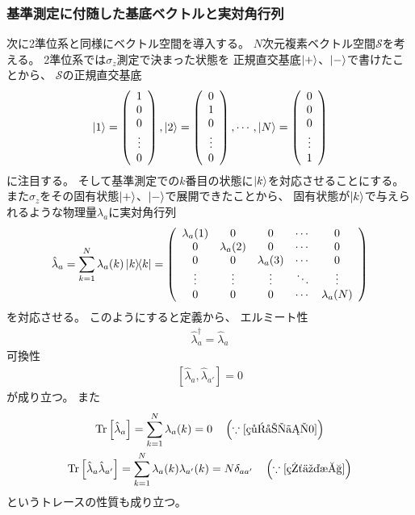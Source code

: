 \documentclass[a4paper, 10pt]{jsarticle}
\begin{document}
\subsubsection{基準測定に付随した基底ベクトルと実対角行列}
次に2準位系と同様にベクトル空間を導入する。
$N$次元複素ベクトル空間$\mathcal{S}$を考える。
2準位系では$\sigma_z$測定で決まった状態を
正規直交基底$\Ket{+}$、$\Ket{-}$で書けたことから、
$\mathcal{S}$の正規直交基底
\begin{align}
	\Ket{1} = \left( \begin{array}{c}
		1 \\ 0 \\ 0 \\ \vdots \\ 0
	\end{array} \right),
	\Ket{2} = \left( \begin{array}{c}
		0 \\ 1 \\ 0 \\ \vdots \\ 0
	\end{array} \right),
	\cdots,
	\Ket{N} = \left( \begin{array}{c}
		0 \\ 0 \\ 0 \\ \vdots \\ 1
	\end{array} \right)
	\label{ket{k}}
\end{align}
に注目する。
そして基準測定での$k$番目の状態に$\Ket{k}$を対応させることにする。
また$\hat{\sigma}_z$をその固有状態$\Ket{+}$、$\Ket{-}$で展開できたことから、
固有状態が$\Ket{k}$で与えられるような物理量$\lambda_a$に実対角行列
\begin{align}
	\hat{\lambda}_a = \sum_{k=1}^N \lambda_a(k) \Ket{k} \! \! \Bra{k}
	= \left( \begin{array}{ccccc}
		\lambda_a(1) & 0 & 0 & \cdots & 0 \\
		0 & \lambda_a(2) & 0 & \cdots & 0 \\
		0 & 0 & \lambda_a(3) & \cdots & 0 \\
		\vdots & \vdots & \vdots & \ddots & \vdots \\
		0 & 0 & 0 & \cdots & \lambda_a(N)
	\end{array} \right)
\end{align}
を対応させる。
このようにすると定義から、
エルミート性
\begin{align}
	\hat{\lambda}_a^\dagger = \hat{\lambda}_a
\end{align}
可換性
\begin{align}
	\left[ \hat{\lambda}_a, \hat{\lambda}_{a'} \right] = 0
\end{align}
が成り立つ。
また
\begin{gather}
	\operatorname*{Tr} \left[ \hat{\lambda}_a \right]
	= \sum_{k=1}^N \lambda_a(k)
	= 0 \quad \left( \because \eqref{総和が0} \right) \\
	\operatorname*{Tr} \left[ \hat{\lambda}_a \hat{\lambda}_{a'} \right]
	= \sum_{k=1}^N \lambda_a(k) \lambda_{a'}(k)
	= N\delta_{aa'} \quad \left( \because \eqref{直交性} \right)	
\end{gather}
というトレースの性質も成り立つ。
\end{document}
